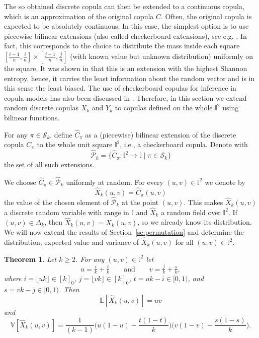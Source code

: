 \documentclass[12pt,a4paper]{amsart}
\newtheorem{theorem}{Theorem}[section]
\theoremstyle{definition}
\newcommand{\II}{\mathbb{I}}
\newcommand{\DK}{\Delta_k}
\newcommand{\SK}{\mathcal{S}_k}
\newcommand{\PKhat}{\widehat{\mathcal{P}}_k}
\newcommand{\Chat}{\widehat{C}}
\newcommand{\Xhat}{\widehat{X}}
\newcommand{\EE}{\mathbb{E}}
\newcommand{\VV}{\mathbb{V}}
\begin{document}
The so obtained discrete copula can then be extended to a continuous copula, which is an approximation of the original copula $C$. 
Often, the original copula is expected to be absolutely continuous. In this case, the simplest option is to use piecewise bilinear extensions (also called checkerboard extensions), see e.g. \cite{MikTay10,JuGrTr21}.
In fact, this corresponds to the choice to distribute the mass inside each square $[\tfrac{i-1}{n},\tfrac{i}{n}] \times [\tfrac{j-1}{n},\tfrac{j}{n}]$ (with known value but unknown distribution) uniformly on the square.
It was shown in \cite{LinWanZhaZha25} that this is an extension with the highest Shannon entropy, hence, it carries the least information about the random vector and is in this sense the least biased.
The use of checkerboard copulas for inference in copula models has also been discussed in \cite{GenNesRem14,GeNeRe17}.
Therefore, in this section we extend random discrete copulas $X_k$ and $Y_k$ to copulas defined on the whole $\II^2$ using bilinear functions.



For any $\pi \in \SK$, define $\displaystyle \Chat_\pi$ as a (piecewise) bilinear extension of the discrete copula  $C_\pi$ to the whole unit square $\II^2$, i.e., a checkerboard copula.  Denote with 
$$\PKhat=\{ \Chat_\pi \colon \II^2 \to \II \mid \pi \in \SK \}$$ 
the set of all such extensions. 

We choose $\Chat_\pi\in \PKhat$ uniformly at random. For every $(u,v) \in \II^2$ we denote by
$$\Xhat_k(u,v)=\Chat_\pi(u,v)$$
the value of the chosen element of $\PKhat$ at the point $(u,v)$. This makes $\Xhat_k(u,v)$ a discrete random variable with range in $\II$ and $\Xhat_k$ a random field over $\II^2$. If $(u,v) \in \DK$, then $\Xhat_k(u,v) = X_k(u,v)$, so we already know its distribution. We will now extend the results of Section~\ref{se:permutation} and determine the distribution, expected value and variance of $\Xhat_k(u,v)$ for all $(u,v) \in \II^2$.


\begin{theorem}\label{th:exk_hat}
    Let $k\ge 2$. For any $(u,v) \in \II^2$ let 
$$u = \tfrac{i}{k} + \tfrac{t}{k} \qquad \text{and} \qquad v = \tfrac{j}{k} + \tfrac{s}{k},$$
where $i=\lfloor uk \rfloor \in [k]_0$, $j=\lfloor vk \rfloor \in[k]_0$, $t = uk -i \in [0,1)$, and $s = vk -j \in [0,1)$. Then 
    $$ \EE[\Xhat_k(u,v)] = uv $$ and $$ \VV[\Xhat_k(u,v)] = \frac{1}{(k-1)}\Big(u(1-u)-\frac{t(1-t)}{k}\Big)\Big(v(1-v)-\frac{s(1-s)}{k}\Big).$$
\end{theorem}
\end{document}
